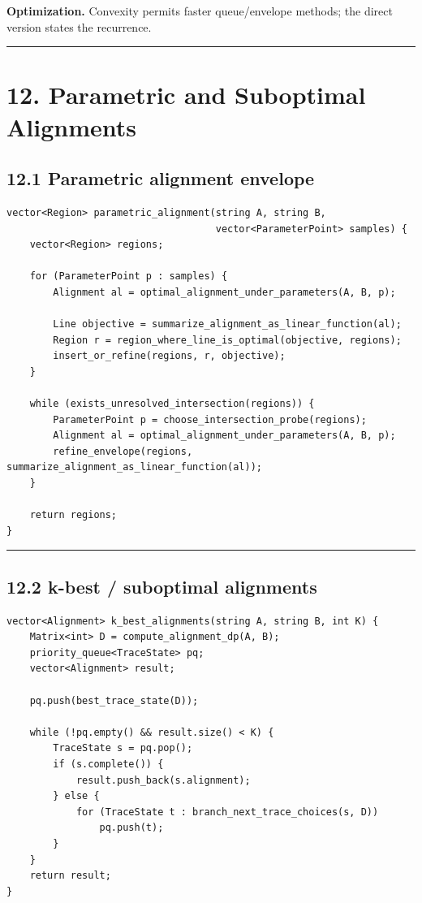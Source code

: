 \documentclass[11pt]{article}
\begin{document}
\textbf{Optimization.} Convexity permits faster queue/envelope methods; the direct version states the recurrence.

\begin{center}\rule{0.5\linewidth}{0.5pt}\end{center}

\section{12. Parametric and Suboptimal Alignments}\label{parametric-and-suboptimal-alignments}

\subsection{12.1 Parametric alignment envelope}\label{parametric-alignment-envelope}

\begin{verbatim}
vector<Region> parametric_alignment(string A, string B,
                                    vector<ParameterPoint> samples) {
    vector<Region> regions;

    for (ParameterPoint p : samples) {
        Alignment al = optimal_alignment_under_parameters(A, B, p);

        Line objective = summarize_alignment_as_linear_function(al);
        Region r = region_where_line_is_optimal(objective, regions);
        insert_or_refine(regions, r, objective);
    }

    while (exists_unresolved_intersection(regions)) {
        ParameterPoint p = choose_intersection_probe(regions);
        Alignment al = optimal_alignment_under_parameters(A, B, p);
        refine_envelope(regions, summarize_alignment_as_linear_function(al));
    }

    return regions;
}
\end{verbatim}

\begin{center}\rule{0.5\linewidth}{0.5pt}\end{center}

\subsection{12.2 k-best / suboptimal alignments}\label{k-best-suboptimal-alignments}

\begin{verbatim}
vector<Alignment> k_best_alignments(string A, string B, int K) {
    Matrix<int> D = compute_alignment_dp(A, B);
    priority_queue<TraceState> pq;
    vector<Alignment> result;

    pq.push(best_trace_state(D));

    while (!pq.empty() && result.size() < K) {
        TraceState s = pq.pop();
        if (s.complete()) {
            result.push_back(s.alignment);
        } else {
            for (TraceState t : branch_next_trace_choices(s, D))
                pq.push(t);
        }
    }
    return result;
}
\end{verbatim}
\end{document}
